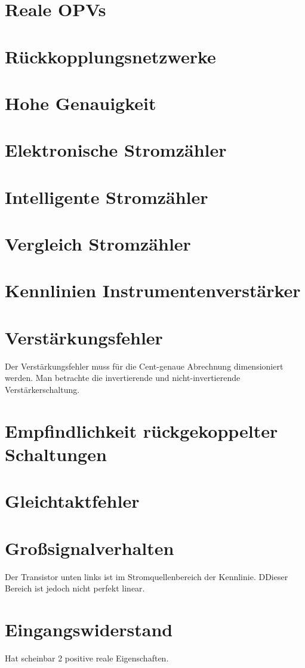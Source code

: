 \documentclass[a5paper]{article}
\begin{document}
\section*{Reale OPVs}
\section*{Rückkopplungsnetzwerke}
\section*{Hohe Genauigkeit}
\section*{Elektronische Stromzähler}
\section*{Intelligente Stromzähler}
\section*{Vergleich Stromzähler}
\section*{Kennlinien Instrumentenverstärker}
\section*{Verstärkungsfehler}
Der Verstärkungsfehler muss für die Cent-genaue Abrechnung dimensioniert werden.
Man betrachte die invertierende und nicht-invertierende Verstärkerschaltung.
\section*{Empfindlichkeit rückgekoppelter Schaltungen}
\section*{Gleichtaktfehler}
\section*{Großsignalverhalten}
Der Transistor unten links ist im Stromquellenbereich der Kennlinie. DDieser Bereich ist jedoch nicht perfekt linear.
\section*{Eingangswiderstand}
Hat scheinbar 2 positive reale Eigenschaften.
\end{document}
